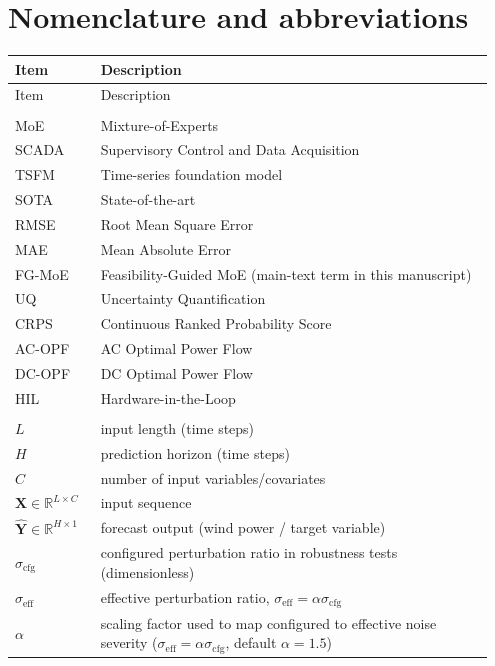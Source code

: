 \documentclass[review,1p,times]{elsarticle}
\begin{document}
\section{Nomenclature and abbreviations}
\begingroup
\footnotesize
\setlength{\tabcolsep}{3pt}
\renewcommand{\arraystretch}{0.92}
\noindent
\nolinenumbers
\begin{longtable}{@{}p{0.17\linewidth}L{0.78\linewidth}@{}}
\toprule
Item & Description \\
\midrule
\endfirsthead
\toprule
Item & Description \\
\midrule
\endhead
\bottomrule
\endlastfoot
{} \\
MoE & Mixture-of-Experts \\
SCADA & Supervisory Control and Data Acquisition \\
TSFM & Time-series foundation model \\
SOTA & State-of-the-art \\
RMSE & Root Mean Square Error \\
MAE & Mean Absolute Error \\
FG-MoE & Feasibility-Guided MoE (main-text term in this manuscript) \\
UQ & Uncertainty Quantification \\
CRPS & Continuous Ranked Probability Score \\
AC-OPF & AC Optimal Power Flow \\
DC-OPF & DC Optimal Power Flow \\
HIL & Hardware-in-the-Loop \\
\addlinespace[2pt]
 \\
$L$ & input length (time steps) \\
$H$ & prediction horizon (time steps) \\
$C$ & number of input variables/covariates \\
$\mathbf{X}\in\mathbb{R}^{L\times C}$ & input sequence \\
$\hat{\mathbf{Y}}\in\mathbb{R}^{H\times 1}$ & forecast output (wind power / target variable) \\
$\sigma_{\mathrm{cfg}}$ & configured perturbation ratio in robustness tests (dimensionless) \\
$\sigma_{\mathrm{eff}}$ & effective perturbation ratio, $\sigma_{\mathrm{eff}}=\alpha\sigma_{\mathrm{cfg}}$ \\
$\alpha$ & scaling factor used to map configured to effective noise severity ($\sigma_{\mathrm{eff}}=\alpha\sigma_{\mathrm{cfg}}$, default $\alpha=1.5$) \\

\end{longtable}
\end{document}
